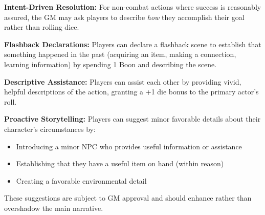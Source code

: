 \textbf{Intent-Driven Resolution:} For non-combat actions where success is reasonably assured, the GM may ask players to describe \emph{how} they accomplish their goal rather than rolling dice.

\textbf{Flashback Declarations:} Players can declare a flashback scene to establish that something happened in the past (acquiring an item, making a connection, learning information) by spending 1 Boon and describing the scene.

\textbf{Descriptive Assistance:} Players can assist each other by providing vivid, helpful descriptions of the action, granting a +1 die bonus to the primary actor's roll.

\textbf{Proactive Storytelling:} Players can suggest minor favorable details about their character's circumstances by:
\begin{itemize}
\item Introducing a minor NPC who provides useful information or assistance
\item Establishing that they have a useful item on hand (within reason)
\item Creating a favorable environmental detail
\end{itemize}

These suggestions are subject to GM approval and should enhance rather than overshadow the main narrative.
